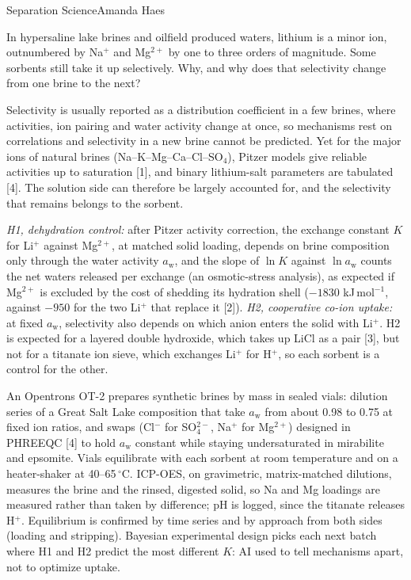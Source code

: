 \documentclass[11pt,letterpaper]{article}
\begin{document}
  {Separation Science}{Amanda Haes}

 In hypersaline lake brines and oilfield produced waters, lithium is a minor
ion, outnumbered by Na$^+$ and Mg$^{2+}$ by one to three orders of magnitude. Some sorbents still take
it up selectively. Why, and why does that selectivity change from one brine to the next?

 Selectivity is usually reported as a distribution coefficient in a few brines,
where activities, ion pairing and water activity change at once, so mechanisms rest on correlations
and selectivity in a new brine cannot be predicted. Yet for the major
ions of natural brines (Na--K--Mg--Ca--Cl--SO$_4$), Pitzer models give reliable activities up to
saturation [1], and binary lithium-salt parameters are tabulated [4]. The solution side can therefore be
largely accounted for, and the selectivity that remains belongs to the sorbent.

 \emph{H1, dehydration control:} after Pitzer activity correction, the exchange
constant $K$ for Li$^+$ against Mg$^{2+}$, at matched solid loading, depends on brine composition only
through the water activity $a_\mathrm{w}$, and the slope of $\ln K$ against $\ln a_\mathrm{w}$ counts the net
waters released per exchange (an osmotic-stress analysis), as expected if Mg$^{2+}$ is excluded by the
cost of shedding its hydration shell ($-1830$ kJ\,mol$^{-1}$, against $-950$ for the two Li$^+$ that
replace it [2]). \emph{H2, cooperative co-ion uptake:}
at fixed $a_\mathrm{w}$, selectivity also depends on which anion enters the solid with Li$^+$. H2 is
expected for a layered double hydroxide, which takes up LiCl as a pair [3], but not for a titanate
ion sieve, which exchanges Li$^+$ for H$^+$, so each sorbent is a control for the other.

 An Opentrons OT-2 prepares synthetic brines by mass in sealed vials: dilution series
of a Great Salt Lake composition that take $a_\mathrm{w}$ from about 0.98 to 0.75 at fixed ion
ratios, and swaps (Cl$^-$ for SO$_4^{2-}$, Na$^+$ for Mg$^{2+}$) designed in PHREEQC [4] to hold
$a_\mathrm{w}$ constant while staying undersaturated in mirabilite and epsomite. Vials equilibrate with each sorbent at room temperature and on a
heater-shaker at 40--65\,$^\circ$C. ICP-OES, on gravimetric, matrix-matched dilutions, measures the
brine and the rinsed, digested solid, so Na and Mg loadings are measured rather than taken by
difference; pH is logged, since the titanate releases H$^+$. Equilibrium is confirmed by time series and by
approach from both sides (loading and stripping). Bayesian experimental design picks each next batch
where H1 and H2 predict the most different $K$: AI used to tell mechanisms apart, not to optimize
uptake.
\end{document}
